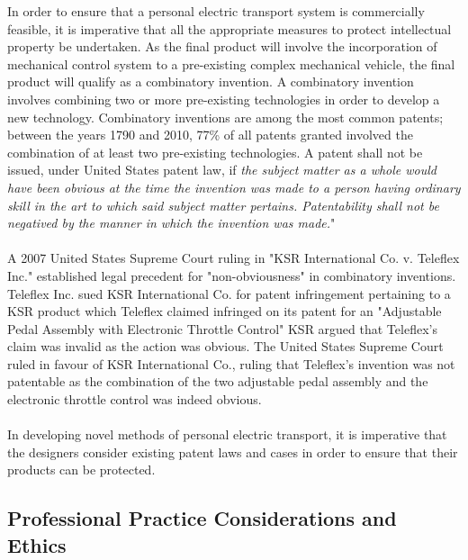 \documentclass[12pt,letterpaper]{article}
\begin{document}
In order to ensure that a personal electric transport system is commercially feasible, it is imperative that all the appropriate measures to protect intellectual property be undertaken. 
As the final product will involve the incorporation of mechanical control system to a pre-existing complex mechanical vehicle, the final product will qualify as a combinatory invention. 
A combinatory invention involves combining two or more pre-existing technologies in order to develop a new technology. 
Combinatory inventions are among the most common patents; between the years 1790 and 2010, 77\% of all patents granted involved the combination of at least two pre-existing technologies. \cite{COMB} 
A patent shall not be issued, under United States patent law, if \emph{the subject matter as a whole would have been obvious at the time the invention was made to a person having ordinary skill in the art to which said subject matter pertains. 
Patentability shall not be negatived by the manner in which the invention was made.}" \cite{NonObv} 
\\
\\
A 2007 United States Supreme Court ruling in "KSR International Co. v. Teleflex Inc." established legal precedent for "non-obviousness" in combinatory inventions. 
Teleflex Inc. sued KSR International Co. for patent infringement pertaining to a KSR product which Teleflex claimed infringed on its patent for an "Adjustable Pedal Assembly with Electronic Throttle Control" \cite{SCOTUS}
KSR argued that Teleflex's claim was invalid as the action was obvious. 
The United States Supreme Court ruled in favour of KSR International Co.,  
ruling that Teleflex's invention was not patentable as the combination of the two adjustable pedal assembly and the electronic throttle control was indeed obvious. 
\\
\\
In developing novel methods of personal electric transport, it is imperative that the designers consider existing patent laws and cases in order to ensure that their products can be protected.


\subsection{Professional Practice Considerations and Ethics}
\end{document}
